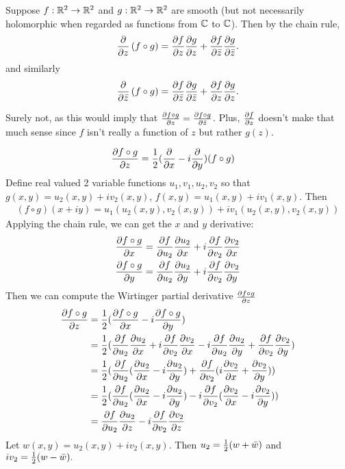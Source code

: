 \documentclass{homework}
\begin{document}
\begin{problem}
  Suppose $f : \mathbb{R}^2 \to \mathbb{R}^2$ and $g : \mathbb{R}^2 \to \mathbb{R}^2$ are smooth (but
  not necessarily holomorphic when regarded as functions from $\mathbb{C}$ to
  $\mathbb{C}$).  Then by the chain rule,
  \[
    \frac{\partial}{\partial z} \left( f \circ g \right) =
    \frac{\partial f}{\partial z} \frac{\partial g}{\partial z} + \frac{\partial f}{\partial \bar{z}} \frac{\partial g}{\partial \bar{z}}.
  \]
  and similarly
  \[
    \frac{\partial}{\partial \bar{z}} \left( f \circ g \right) =
    \frac{\partial f}{\partial \bar{z}} \frac{\partial g}{\partial \bar{z}} + \frac{\partial f}{\partial z} \frac{\partial g}{\partial z}.
  \]
\end{problem}
\begin{solution}
Surely not, as this would imply that $\frac{\partial f\circ g}{\partial z} = \frac{\partial f\circ g}{\partial \bar{z}}$. Plus, $\frac{\partial f}{\partial z}$ doesn't make that much sense since $f$ isn't really a function of $z$ but rather $g(z)$.

\begin{align*}
\frac{\partial f\circ g}{\partial z} &= \frac{1}{2}(\frac{\partial }{\partial x} - i\frac{\partial }{\partial y})(f\circ g)
\end{align*}
Define real valued 2 variable functions $u_1, v_1, u_2, v_2$ so that $g(x,y) = u_2(x,y) + iv_2(x,y)$, $f(x, y) = u_1(x, y) + iv_1(x, y)$. Then 
\begin{align*}
(f\circ g)(x+iy) = u_1(u_2(x, y), v_2(x, y)) + iv_1(u_2(x, y), v_2(x, y))
\end{align*}
Applying the chain rule, we can get the $x$ and $y$ derivative:
\begin{align*}
\frac{\partial f\circ g}{\partial x} &= \frac{\partial f}{\partial u_2}\frac{\partial u_2}{\partial x} + i\frac{\partial f}{\partial v_2}\frac{\partial v_2}{\partial x}\\
\frac{\partial f\circ g}{\partial y} &= \frac{\partial f}{\partial u_2}\frac{\partial u_2}{\partial y} + i\frac{\partial f}{\partial v_2}\frac{\partial v_2}{\partial y}
\end{align*}
Then we can compute the Wirtinger partial derivative $\frac{\partial f\circ g}{\partial z}$
\begin{align*} 
\frac{\partial f\circ g}{\partial z} &= \frac{1}{2}(\frac{\partial f\circ g}{\partial x} - i \frac{\partial f\circ g}{\partial y})\\
&= \frac{1}{2}(\frac{\partial f}{\partial u_2}\frac{\partial u_2}{\partial x} + i\frac{\partial f}{\partial v_2}\frac{\partial v_2}{\partial x} -  i\frac{\partial f}{\partial u_2}\frac{\partial u_2}{\partial y} + \frac{\partial f}{\partial v_2}\frac{\partial v_2}{\partial y})\\
&= \frac{1}{2}(\frac{\partial f}{\partial u_2}(\frac{\partial u_2}{\partial x} -i\frac{\partial u_2}{\partial y}) + \frac{\partial f}{\partial v_2}(i\frac{\partial v_2}{\partial x} + \frac{\partial v_2}{\partial y}))\\
&= \frac{1}{2}(\frac{\partial f}{\partial u_2}(\frac{\partial u_2}{\partial x} -i\frac{\partial u_2}{\partial y}) - i\frac{\partial f}{\partial v_2}(\frac{\partial v_2}{\partial x} - i\frac{\partial v_2}{\partial y}))\\
&= \frac{\partial f}{\partial u_2}\frac{\partial u_2}{\partial z} - i\frac{\partial f}{\partial v_2}\frac{\partial v_2}{\partial z}
\end{align*}
Let $w(x, y) = u_2(x, y) + iv_2(x, y).$ Then $u_2 = \frac{1}{2}(w + \bar{w})$ and $iv_2 = \frac{1}{2}(w - \bar{w}).$


\end{solution}
\end{document}
